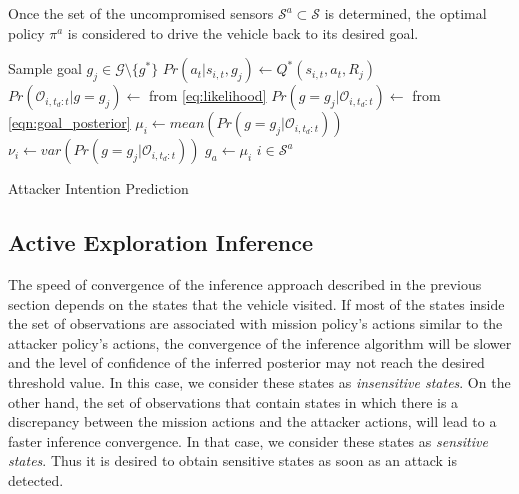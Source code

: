\documentclass[letterpaper, 10 pt, conference]{ieeeconf}  %
\begin{document}
Once the set of the uncompromised sensors $\mathcal{S}^a \subset \mathcal S$ is determined, the optimal policy $\pi^a$ is considered to drive the vehicle back to its desired goal.

\begin{algorithm}\label{alg:alg1}
    {
        {
            Sample goal $g_j \in \mathcal{G} \setminus \{g^*\}$\;
            $Pr(a_t|s_{i,t},g_j) \leftarrow Q^*(s_{i,t},a_t,R_j)$\;
            $Pr(\mathcal{O}_{i,t_d:t}|g=g_j) \leftarrow$  from \eqref{eq:likelihood}\;
            $Pr(g=g_j|\mathcal{O}_{i,t_d:t}) \leftarrow$ from \eqref{eqn:goal_posterior}\;
        }
        $\mu_i \leftarrow mean(Pr(g=g_j|\mathcal{O}_{i,t_d:t}))$\;
        $\nu_i \leftarrow  var(Pr(g=g_j|\mathcal{O}_{i,t_d:t}))$\;
        {
            $g_a \leftarrow \mu_i$\;
            $i \in \mathcal{S}^a$\;
        }
    }
    \caption{Attacker Intention Prediction}
\end{algorithm}

\subsection{Active Exploration Inference}\label{sec:approach2}
The speed of convergence of the inference approach described in the previous section depends on the states that the vehicle visited. If most of the states inside the set of observations are associated with mission policy's actions similar to the attacker policy's actions, the convergence of the inference algorithm will be slower and the level of confidence of the inferred posterior may not reach the desired threshold value. In this case, we consider these states as {\em insensitive states}. On the other hand, the set of observations that contain states in which there is a discrepancy between the mission actions and the attacker actions, will lead to a faster inference convergence. In that case, we consider these states as {\em sensitive states}. Thus it is desired to obtain sensitive states as soon as an attack is detected.
\end{document}
